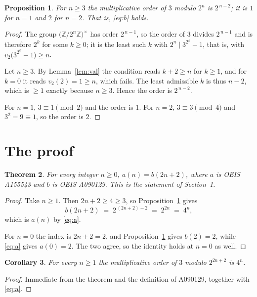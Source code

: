 \documentclass[11pt,a4paper]{article}
\theoremstyle{plain}
\newtheorem{theorem}{Theorem}
\newtheorem{proposition}[theorem]{Proposition}
\newtheorem{corollary}[theorem]{Corollary}
\theoremstyle{definition}
\begin{document}
\begin{proposition}\label{prop:ord}
For $n\ge3$ the multiplicative order of $3$ modulo $2^{n}$ is $2^{\,n-2}$; it is $1$ for
$n=1$ and $2$ for $n=2$. That is, \eqref{eq:b} holds.
\end{proposition}

\begin{proof}
The group $\bigl(\mathbb{Z}/2^{n}\mathbb{Z}\bigr)^{\times}$ has order $2^{\,n-1}$, so the
order of $3$ divides $2^{\,n-1}$ and is therefore $2^{k}$ for some $k\ge0$; it is the
least such $k$ with $2^{n}\mid 3^{2^{k}}-1$, that is, with $v_2\bigl(3^{2^{k}}-1\bigr)\ge n$.

Let $n\ge3$. By Lemma~\ref{lem:val} the condition reads $k+2\ge n$ for $k\ge1$, and for
$k=0$ it reads $v_2(2)=1\ge n$, which fails. The least admissible $k$ is thus $n-2$, which
is $\ge1$ exactly because $n\ge3$. Hence the order is $2^{\,n-2}$.

For $n=1$, $3\equiv1\pmod2$ and the order is $1$. For $n=2$, $3\equiv3\pmod4$ and
$3^{2}=9\equiv1$, so the order is $2$.
\end{proof}

\section{The proof}

\begin{theorem}
For every integer $n\ge0$, $a(n)=b(2n+2)$, where $a$ is OEIS A155543 and $b$ is OEIS
A090129. This is the statement of Section~1.
\end{theorem}

\begin{proof}
Take $n\ge1$. Then $2n+2\ge4\ge3$, so Proposition~\ref{prop:ord} gives
\[
b(2n+2)\;=\;2^{\,(2n+2)-2}\;=\;2^{2n}\;=\;4^{n},
\]
which is $a(n)$ by \eqref{eq:a}.

For $n=0$ the index is $2n+2=2$, and Proposition~\ref{prop:ord} gives $b(2)=2$, while \eqref{eq:a}
gives $a(0)=2$. The two agree, so the identity holds at $n=0$ as well.
\end{proof}

\begin{corollary}
For every $n\ge1$ the multiplicative order of $3$ modulo $2^{2n+2}$ is $4^{n}$.
\end{corollary}

\begin{proof}
Immediate from the theorem and the definition of A090129, together with \eqref{eq:a}.
\end{proof}
\end{document}
